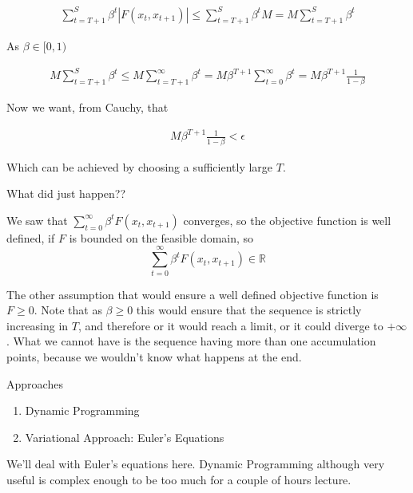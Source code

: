 \documentclass[aspectratio=169]{beamer}
\begin{document}
\begin{frame}

\begin{align*}
    \sum_{t=T+1}^S\beta^t |F(x_t,x_{t+1})| \leq \sum_{t=T+1}^S\beta^t M = M \sum_{t=T+1}^S\beta^t
\end{align*}

As $\beta\in[0,1)$
    
    \begin{align*}
        M \sum_{t=T+1}^S\beta^t \leq M \sum_{t=T+1}^\infty\beta^t = M\beta^{T+1} \sum_{t=0}^\infty\beta^t = M \beta^{T+1}\frac{1}{1-\beta}
    \end{align*}
    
    Now we want, from Cauchy, that
    
    \begin{align*}
        M \beta^{T+1}\frac{1}{1-\beta} < \epsilon
    \end{align*}
    
    Which can be achieved by choosing a sufficiently large $T$.
    
\end{frame}

\begin{frame}{What did just happen??}
    
    We saw that $\sum_{t=0}^\infty \beta^t F(x_t,x_{t+1})$ converges, so the objective function is well defined, if $F$ is bounded on the feasible domain, so $$\sum_{t=0}^\infty \beta^t F(x_t,x_{t+1}) \in \mathds{R}$$
    
    \vspace{0.5cm}
    
    The other assumption that would ensure a well defined objective function is $F\geq0$. Note that as $\beta\geq 0$ this would ensure that the sequence is strictly increasing in $T$, and therefore or it would reach a limit, or it could diverge to $+\infty$. What we cannot have is the sequence having more than one accumulation points, because we wouldn't know what happens at the end.
    
\end{frame}

\begin{frame}{Approaches}
    
    \begin{enumerate}
        \item Dynamic Programming
        \item Variational Approach: Euler's Equations
    \end{enumerate}
    
    \pause
    
    \vspace{0.5cm}
    
    We'll deal with Euler's equations here. Dynamic Programming although very useful is complex enough to be too much for a couple of hours lecture.
    
\end{frame}
\end{document}
